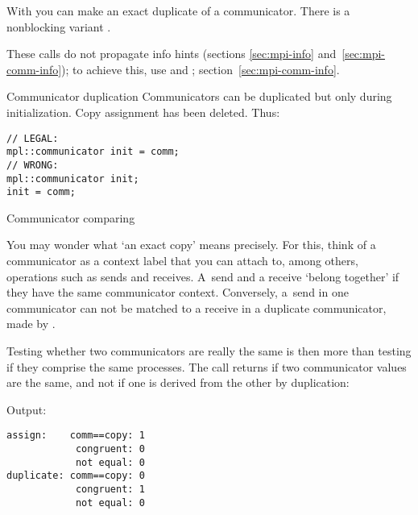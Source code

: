 
With  you can make an exact duplicate of a communicator.
There is a nonblocking variant .

These calls do not propagate info hints
(sections \ref{sec:mpi-info} and~\ref{sec:mpi-comm-info});
to achieve this,
use  and ;
section~\ref{sec:mpi-comm-info}.

\begin{mplnote}{Communicator duplication}
  Communicators can be duplicated but only during initialization.
  Copy assignment has been deleted. Thus:
\begin{lstlisting}
// LEGAL: 
mpl::communicator init = comm;
// WRONG:
mpl::communicator init;
init = comm;
\end{lstlisting}
\end{mplnote}

 {Communicator comparing}
\label{sec:comm-compare}

You may wonder what `an exact copy' means precisely.
For this, think of a communicator as a context label that you can attach to,
among others, operations such as sends and receives.
A~send and a receive `belong together' if they have the same communicator context.
Conversely, a~send in one communicator can not be matched
to a receive in a duplicate communicator, made by .

Testing whether two communicators are really the same
is then more than testing if they comprise the same processes.
The call  returns 
if two communicator values are the same,
and not if one is derived from the other by duplication:
%
\begin{multicols}{2}
\columnbreak
Output:
\begin{verbatim}
assign:    comm==copy: 1
            congruent: 0
            not equal: 0
duplicate: comm==copy: 0
            congruent: 1
            not equal: 0
\end{verbatim}
\end{multicols}

